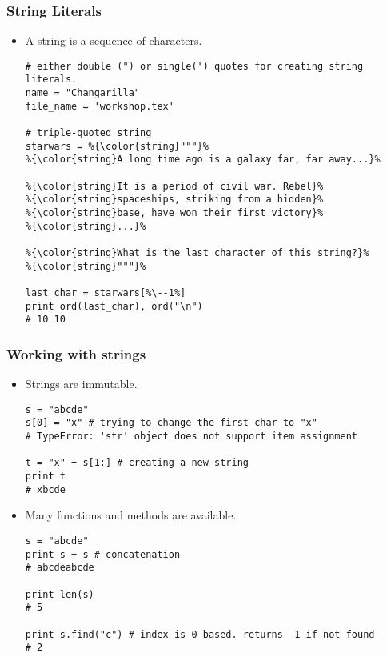 \documentclass{beamer}
\begin{document}
\begin{frame}[fragile]
\frametitle{String Literals}
\begin{itemize}
\item A string is a sequence of characters.
\begin{lstlisting}[escapechar=\%]
# either double (") or single(') quotes for creating string literals.
name = "Changarilla"
file_name = 'workshop.tex'

# triple-quoted string
starwars = %{\color{string}"""}%
%{\color{string}A long time ago is a galaxy far, far away...}%

%{\color{string}It is a period of civil war. Rebel}%
%{\color{string}spaceships, striking from a hidden}%
%{\color{string}base, have won their first victory}%
%{\color{string}...}%

%{\color{string}What is the last character of this string?}%
%{\color{string}"""}%

last_char = starwars[%\--1%]
print ord(last_char), ord("\n")
# 10 10
\end{lstlisting}
\end{itemize}
\end{frame}

\begin{frame}[fragile]
\frametitle{Working with strings}
\begin{itemize}
\item Strings are immutable.
\begin{lstlisting}
s = "abcde"
s[0] = "x" # trying to change the first char to "x"
# TypeError: 'str' object does not support item assignment

t = "x" + s[1:] # creating a new string
print t
# xbcde
\end{lstlisting} 
\item Many functions and methods are available. 
\begin{lstlisting}
s = "abcde"
print s + s # concatenation 
# abcdeabcde

print len(s)
# 5

print s.find("c") # index is 0-based. returns -1 if not found
# 2
\end{lstlisting} 
\end{itemize}
\end{frame}
\end{document}
